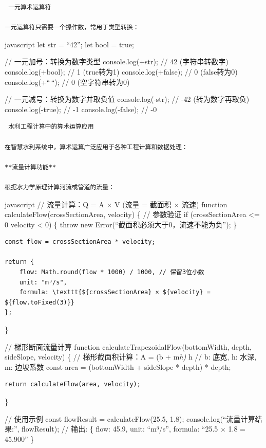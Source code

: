 \begin{lstlisting}
 一元算术运算符

一元运算符只需要一个操作数，常用于类型转换：
\end{lstlisting}

javascript let str = ``42''; let bool = true;

// 一元加号：转换为数字类型 console.log(+str); // 42 (字符串转数字) console.log(+bool); // 1 (true转为1) console.log(+false); // 0 (false转为0) console.log(+``\,``); // 0 (空字符串转为0)

// 一元减号：转换为数字并取负值 console.log(-str); // -42 (转为数字再取负) console.log(-true); // -1 console.log(-false); // -0

\begin{lstlisting}
 水利工程计算中的算术运算应用

在智慧水利系统中，算术运算广泛应用于各种工程计算和数据处理：

**流量计算功能**

根据水力学原理计算河流或管道的流量：
\end{lstlisting}

javascript // 流量计算：Q = A × V (流量 = 截面积 × 流速) function calculateFlow(crossSectionArea, velocity) \{ // 参数验证 if (crossSectionArea \textless= 0 \textbar\textbar{} velocity \textless{} 0) \{ throw new Error(``截面积必须大于0，流速不能为负''); \}

\begin{verbatim}
const flow = crossSectionArea * velocity;

return {
    flow: Math.round(flow * 1000) / 1000, // 保留3位小数
    unit: "m³/s",
    formula: \texttt{${crossSectionArea} × ${velocity} = ${flow.toFixed(3)}}
};
\end{verbatim}

\}

// 梯形断面流量计算 function calculateTrapezoidalFlow(bottomWidth, depth, sideSlope, velocity) \{ // 梯形截面积计算：A = (b + m\emph{h) } h // b: 底宽, h: 水深, m: 边坡系数 const area = (bottomWidth + sideSlope * depth) * depth;

\begin{verbatim}
return calculateFlow(area, velocity);
\end{verbatim}

\}

// 使用示例 const flowResult = calculateFlow(25.5, 1.8); console.log(``流量计算结果:'', flowResult); // 输出: \{ flow: 45.9, unit: ``m³/s'', formula: ``25.5 × 1.8 = 45.900'' \}

